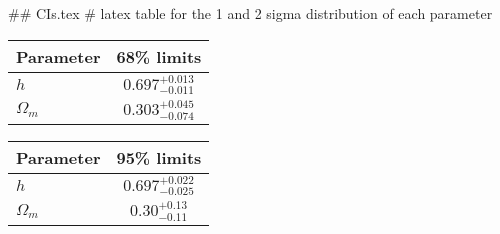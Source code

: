 ## CIs.tex
# latex table for the 1 and 2 sigma distribution of each parameter

\begin{tabular} { l  c}
 Parameter &  68\% limits\\
\hline
{\boldmath$h              $} & $0.697^{+0.013}_{-0.011}   $\\
{\boldmath$\Omega_m       $} & $0.303^{+0.045}_{-0.074}   $\\
\hline
\end{tabular}

\begin{tabular} { l  c}
 Parameter &  95\% limits\\
\hline
{\boldmath$h              $} & $0.697^{+0.022}_{-0.025}   $\\
{\boldmath$\Omega_m       $} & $0.30^{+0.13}_{-0.11}      $\\
\hline
\end{tabular}
